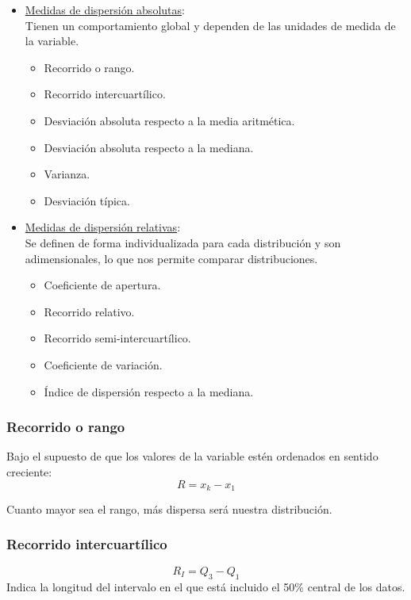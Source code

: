 \begin{itemize}
    \item \underline{Medidas de dispersión absolutas}:\\
    Tienen un comportamiento global y dependen de las unidades de medida de la variable.
          \begin{itemize}
              \item Recorrido o rango.
              \item Recorrido intercuartílico.
              \item Desviación absoluta respecto a la media aritmética.
              \item Desviación absoluta respecto a la mediana.
              \item Varianza.
              \item Desviación típica.
          \end{itemize}
    \item \underline{Medidas de dispersión relativas}:\\
    Se definen de forma individualizada para cada distribución y son adimensionales, lo que nos permite comparar distribuciones.
          \begin{itemize}
              \item Coeficiente de apertura.
              \item Recorrido relativo.
              \item Recorrido semi-intercuartílico.
              \item Coeficiente de variación.
              \item Índice de dispersión respecto a la mediana.
          \end{itemize}
\end{itemize}

\subsubsection{Recorrido o rango}

Bajo el supuesto de que los valores de la variable estén ordenados en sentido creciente:
$$R = x_k - x_1$$

Cuanto mayor sea el rango, más dispersa será nuestra distribución.

\subsubsection{Recorrido intercuartílico}
$$R_I = Q_3 - Q_1$$
Indica la longitud del intervalo en el que está incluido el 50\% central de los datos.

